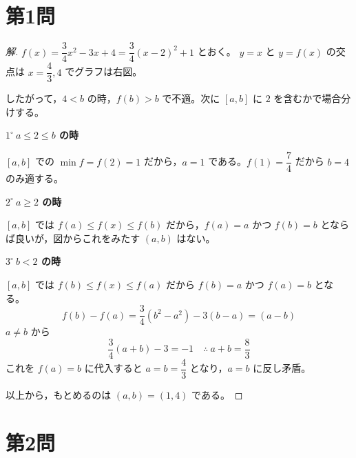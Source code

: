 \documentclass[../main.tex]{subfiles}
\begin{document}
\section*{第1問}

\begin{proof}[解]
  $f(x)=\dfrac{3}{4}x^2-3x+4=\dfrac{3}{4}(x-2)^2+1$ とおく。
  $y=x$ と $y=f(x)$ の交点は $x=\dfrac{4}{3},4$ でグラフは右図。

  \begin{center}
  \end{center}

  したがって，$4<b$ の時，$f(b)>b$ で不適。次に $[a,b]$ に $2$ を含むかで場合分けする。

  \textbf{$1^\circ\ a\le2\le b$ の時}

  $[a,b]$ での $\min f=f(2)=1$ だから，$a=1$ である。$f(1)=\dfrac{7}{4}$ だから $b=4$ のみ適する。

  \textbf{$2^\circ\ a\ge2$ の時}

  $[a,b]$ では $f(a)\le f(x)\le f(b)$ だから，$f(a)=a$ かつ $f(b)=b$ とならば良いが，図からこれをみたす $(a,b)$ はない。

  \textbf{$3^\circ\ b<2$ の時}

  $[a,b]$ では $f(b)\le f(x)\le f(a)$ だから $f(b)=a$ かつ $f(a)=b$ となる。
  \[
    f(b)-f(a)=\frac{3}{4}(b^2-a^2)-3(b-a)=(a-b)
  \]
  $a\ne b$ から
  \[
    \frac{3}{4}(a+b)-3=-1 \quad\therefore\ a+b=\frac{8}{3}
  \]
  これを $f(a)=b$ に代入すると $a=b=\dfrac{4}{3}$ となり，$a=b$ に反し矛盾。

  以上から，もとめるのは $(a,b)=(1,4)$ である。
\end{proof}

\newpage

\section*{第2問}
\end{document}
